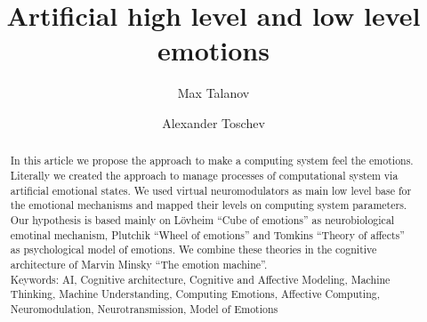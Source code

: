 \documentclass[oribibl]{llncs}
\begin{document}
\title{Artificial high level and low level emotions}
\author{Max Talanov \and Alexander Toschev}
\maketitle
\begin{abstract}
In this article we propose the approach to make a computing system feel the emotions. Literally we created the approach to manage processes of computational system via artificial emotional states. We used virtual neuromodulators as main low level base for the emotional mechanisms and mapped their levels on computing system parameters. Our hypothesis is based mainly on L\"{o}vheim ``Cube of emotions'' \cite{cubeofemotions} as neurobiological emotinal mechanism, Plutchik ``Wheel of emotions'' \cite{natureofemotions} and Tomkins ``Theory of affects'' \cite{primer_affect_psychology} as psychological model of emotions. We combine these theories in the cognitive architecture of Marvin Minsky \cite{emotionmachine} ``The emotion machine''.\\
Keywords: AI, Cognitive architecture, Cognitive and Affective Modeling, Machine Thinking, Machine Understanding, Computing Emotions, Affective Computing, Neuromodulation, Neurotransmission, Model of Emotions
\end{abstract}



\end{document}
